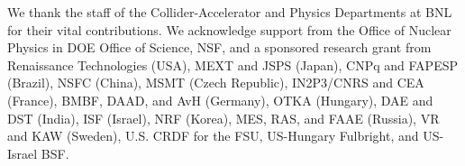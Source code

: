 \documentclass[aps,prc,superscriptaddress,showpacs,nofootinbib,floatfix,twocolumn]{revtex4}
\begin{document}


We thank the staff of the Collider-Accelerator and 
Physics Departments at BNL for their vital contributions.  
We acknowledge support from 
the Office of Nuclear Physics in DOE Office of Science, NSF,  
and a sponsored research grant from Renaissance Technologies (USA),
MEXT and JSPS (Japan), 
CNPq and FAPESP (Brazil), 
NSFC (China), 
MSMT (Czech Republic),
IN2P3/CNRS and CEA (France), 
BMBF, DAAD, and AvH (Germany), 
OTKA (Hungary), 
DAE and DST (India), 
ISF (Israel), 
NRF (Korea), 
MES, RAS, and FAAE (Russia),
VR and KAW (Sweden), 
U.S. CRDF for the FSU, 
US-Hungary Fulbright, 
and US-Israel BSF.

%

\end{document}

